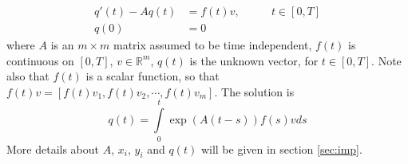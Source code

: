 \begin{equation} \label{eqn:numheat}
\begin{aligned}
q'(t) -Aq(t) &= f(t) v, \qquad & t \in [0,T] \\
q(0) &= 0               
\end{aligned}
\end{equation}
where $A$ is an $m \times m$ matrix assumed to be time independent, $f(t)$ is continuous on $[0,T]$, $v \in \mathbb{R}^m$, $q(t)$ is the unknown vector, for $t \in [0,T]$. Note also that $f(t)$ is a scalar function, so that $f(t) v = [f(t)v_1,f(t)v_2, \cdots,f(t) v_m] $.
The solution is 
\begin{equation}
q(t) = \int \limits_0^t \exp(A(t-s))f(s)v ds
\end{equation}
More details about $A$, $x_i$, $y_i$ and $q(t)$ will be given in section \ref{sec:imp}.
